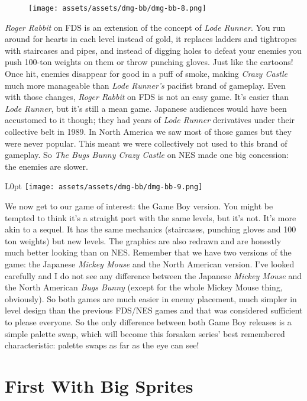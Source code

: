 \documentclass{book}
\begin{document}
\begin{figure}[hbt]
\vskip 10pt
\centering \texttt{[image: assets/assets/dmg-bb/dmg-bb-8.png]}
\vskip 6pt
\end{figure}
\emph{Roger Rabbit} on FDS is an extension of the concept of \emph{Lode Runner}. You run around for hearts in each level instead of gold, it replaces ladders and tightropes with staircases and pipes, and instead of digging holes to defeat your enemies you push 100-ton weights on them or throw punching gloves. Just like the cartoons! Once hit, enemies disappear for good in a puff of smoke, making \emph{Crazy Castle} much more manageable than \emph{Lode Runner’s} pacifist brand of gameplay. Even with those changes, \emph{Roger Rabbit} on FDS is not an easy game. It’s easier than \emph{Lode Runner}, but it’s still a mean game. Japanese audiences would have been accustomed to it though; they had years of \emph{Lode Runner} derivatives under their collective belt in 1989. In North America we saw most of those games but they were never popular. This meant we were collectively not used to this brand of gameplay. So \emph{The Bugs Bunny Crazy Castle} on NES made one big concession: the enemies are slower.

\begin{wrapfigure}{L}{0pt} \texttt{[image: assets/assets/dmg-bb/dmg-bb-9.png]}\end{wrapfigure}
We now get to our game of interest: the Game Boy version. You might be tempted to think it’s a straight port with the same levels, but it’s not. It’s more akin to a sequel. It has the same mechanics (staircases, punching gloves and 100 ton weights) but new levels. The graphics are also redrawn and are honestly much better looking than on NES. Remember that we have two versions of the game: the Japanese \emph{Mickey Mouse} and the North American version. I’ve looked carefully and I do not see any difference between the Japanese \emph{Mickey Mouse} and the North American \emph{Bugs Bunny} (except for the whole Mickey Mouse thing, obviously). So both games are much easier in enemy placement, much simpler in level design than the previous FDS/NES games and that was considered sufficient to please everyone. So the only difference between both Game Boy releases is a simple palette swap, which will become this forsaken series’ best remembered characteristic: palette swaps as far as the eye can see!

\FloatBarrier\needspace{10mm}\section*{First With Big Sprites}\nopagebreak[4]
\end{document}
